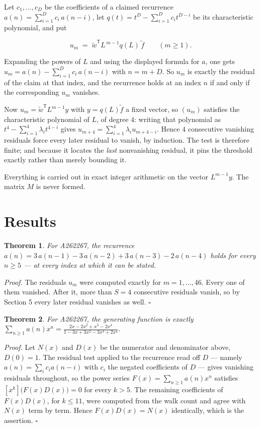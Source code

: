 \documentclass[11pt]{article}
\newtheorem{theorem}{Theorem}
\theoremstyle{definition}
\begin{document}
Let $c_1,\dots,c_D$ be the coefficients of a claimed recurrence $a(n) = \sum_{i=1}^{D} c_i\,a(n-i)$, let $q(t) = t^{D} - \sum_{i=1}^{D} c_i t^{D-i}$ be its characteristic polynomial, and put

\[u_m \;=\; \tilde w^{\mathsf T} L^{\,m-1} q(L)\,\tilde f \qquad (m \ge 1).\]

Expanding the powers of $L$ and using the displayed formula for $a$, one gets $u_m = a(n) - \sum_{i=1}^{D} c_i\,a(n-i)$ with $n = m + D$. So $u_m$ is exactly the residual of the claim at that index, and the recurrence holds at an index $n$ if and only if the corresponding $u_m$ vanishes.

Now $u_m = \tilde w^{\mathsf T} L^{m-1} y$ with $y = q(L)\tilde f$ a fixed vector, so $(u_m)$ satisfies the characteristic polynomial of $L$, of degree $4$: writing that polynomial as $t^{4} - \sum_{i=1}^{4} \lambda_i t^{4-i}$ gives $u_{m+4} = \sum_{i=1}^{4} \lambda_i u_{m+4-i}$. Hence $4$ consecutive vanishing residuals force every later residual to vanish, by induction. The test is therefore finite; and because it locates the {\itshape last} nonvanishing residual, it pins the threshold exactly rather than merely bounding it.

Everything is carried out in exact integer arithmetic on the vector $L^{m-1}y$. The matrix $M$ is never formed.

\section{Results}

\begin{theorem} For A262267, the recurrence $a(n) = 3\,a(n-1) - 3\,a(n-2) + 3\,a(n-3) - 2\,a(n-4)$ holds for every $n \ge 5$ --- at every index at which it can be stated.\end{theorem}

{\itshape Proof.} The residuals $u_m$ were computed exactly for $m = 1,\dots,46$. Every one of them vanished. After it, more than $S = 4$ consecutive residuals vanish, so by Section 5 every later residual vanishes as well. $\square$

\begin{theorem} For A262267, the generating function is exactly $\sum_{n\ge 1} a(n)x^n = \frac{2x - 2x^{2} + x^{3} - 2x^{4}}{1 - 3x + 3x^{2} - 3x^{3} + 2x^{4}}$.\end{theorem}

{\itshape Proof.} Let $N(x)$ and $D(x)$ be the numerator and denominator above, $D(0)=1$. The residual test applied to the recurrence read off $D$ --- namely $a(n) = \sum_i c_i a(n-i)$ with $c_i$ the negated coefficients of $D$ --- gives vanishing residuals throughout, so the power series $F(x)=\sum_{n\ge 1}a(n)x^n$ satisfies $[x^k]\bigl(F(x)D(x)\bigr) = 0$ for every $k > 5$. The remaining coefficients of $F(x)D(x)$, for $k \le 11$, were computed from the walk count and agree with $N(x)$ term by term. Hence $F(x)D(x) = N(x)$ identically, which is the assertion. $\square$
\end{document}
